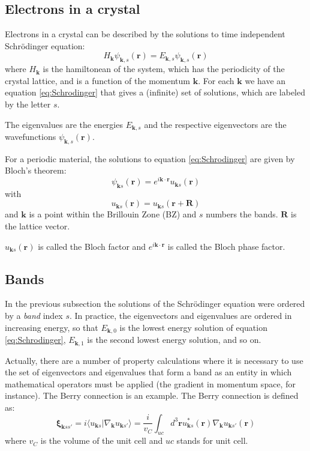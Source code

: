 \documentclass[a4paper,12pt]{report}
\begin{document}
\subsection*{Electrons in a crystal}

Electrons in a crystal can be described by the solutions to time independent Schr\"odinger equation:
\begin{equation}\label{eq:Schrodinger}
 H_{\pmb{k}}\psi_{\pmb{k},s}(\pmb{r}) = E_{\pmb{k},s}\psi_{\pmb{k},s}(\pmb{r})
\end{equation}
where $H_{\pmb{k}}$ is the hamiltonean of the system, which has the periodicity of the crystal lattice,
and is a function of the momentum $\pmb{k}$.
For each $\pmb{k}$ we have an equation \ref{eq:Schrodinger} that gives a (infinite) set of solutions,
which are labeled by the letter $s$.

The eigenvalues are the energies $E_{\pmb{k},s}$ and the respective eigenvectors are the wavefunctions
$\psi_{\pmb{k},s}(\pmb{r})$.

For a periodic material, the solutions to equation \ref{eq:Schrodinger} are given by Bloch's theorem:
\begin{equation}
 \psi_{\pmb{k}s}(\pmb{r}) = e^{i\pmb{k}\cdot\pmb{r}}u_{\pmb{k}s}(\pmb{r})
\end{equation}
with
\begin{equation}
 u_{\pmb{k}s}(\pmb{r}) = u_{\pmb{k}s}(\pmb{r} + \pmb{R})
\end{equation}
and $\pmb{k}$ is a point within the Brillouin Zone (BZ) and $s$ numbers the bands.
$\pmb{R}$ is the lattice vector.

$u_{\pmb{k}s}(\pmb{r})$ is called the Bloch factor and $e^{i\pmb{k}\cdot\pmb{r}}$
is called the Bloch phase factor.


\subsection*{Bands}

In the previous subsection the solutions of the Schr\"odinger equation were ordered by a \emph{band} index $s$.
In practice, the eigenvectors and eigenvalues are ordered in increasing energy, so that $E_{\pmb{k},0}$ is
the lowest energy solution of equation \ref{eq:Schrodinger}, $E_{\pmb{k},1}$ is the second lowest energy solution,
and so on.

Actually, there are a number of property calculations where it is necessary to use the set of eigenvectors
and eigenvalues that form a band as an entity in which mathematical operators must be applied
(the gradient in momentum space, for instance).
The Berry connection is an example.
The Berry connection is defined as:
\begin{equation}\label{eq:berry}
 \pmb{\xi}_{\pmb{k}ss'} = i\langle u_{\pmb{k}s}|\nabla_{\pmb{k}} u_{\pmb{k}s'} \rangle
                          = \dfrac{i}{v_C}\int_{uc} d^3\pmb{r}u_{\pmb{k}s}^*(\pmb{r})
                          \nabla_{\pmb{k}} u_{\pmb{k}s'}(\pmb{r})
\end{equation}
where $v_C$ is the volume of the unit cell and $uc$ stands for unit cell.
\end{document}
